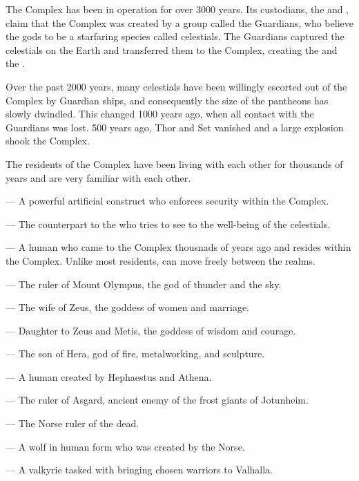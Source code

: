 \documentclass[blue]{guardians}
\begin{document}
\name{\bWhosWho{}}

The Complex has been in operation for over 3000 years. Its custodians, the \cCaretaker{} and \cWarden{}, claim that the Complex was created by a group called the Guardians, who believe the gods to be a starfaring species called celestials. The Guardians captured the celestials on the Earth and transferred them to the Complex, creating the \cCaretaker{} and the \cWarden{}.

Over the past 2000 years, many celestials have been willingly escorted out of the Complex by Guardian ships, and consequently the size of the pantheons has slowly dwindled. This changed 1000 years ago, when all contact with the Guardians was lost. 500 years ago, Thor and Set vanished and a large explosion shook the Complex.

The residents of the Complex have been living with each other for thousands of years and are very familiar with each other.

\begin{itemz}
\item \cWarden{} --- A powerful artificial construct who enforces security within the Complex.
 \item \cCaretaker{} --- The counterpart to the \cWarden{} who tries to see to the well-being of the celestials.
 \item \cJascha{} --- A human who came to the Complex thousnads of years ago and resides within the Complex. Unlike most residents, \cJascha{\they} can move freely between the realms.
\end{itemz}

\begin{itemz}
  \item \cZeus{} --- The ruler of Mount Olympus, the god of thunder and the sky.
  \item \cHera{} --- The wife of Zeus, the goddess of women and marriage.
  \item \cAthena{} --- Daughter to Zeus and Metis, the goddess of wisdom and courage.
  \item \cHephaestus{} --- The son of Hera, god of fire, metalworking, and sculpture.
  \item \cPandora{} --- A human created by Hephaestus and Athena.
\end{itemz}

\begin{itemz}
  \item \cOdin{} --- The ruler of Asgard, ancient enemy of the frost giants of Jotunheim.
  \item \cHel{} --- The Norse ruler of the dead.
  \item \cFenrir{} --- A wolf in human form who was created by the Norse.
  \item \cVal{} --- A valkyrie tasked with bringing chosen warriors to Valhalla.
\end{itemz}
\end{document}
